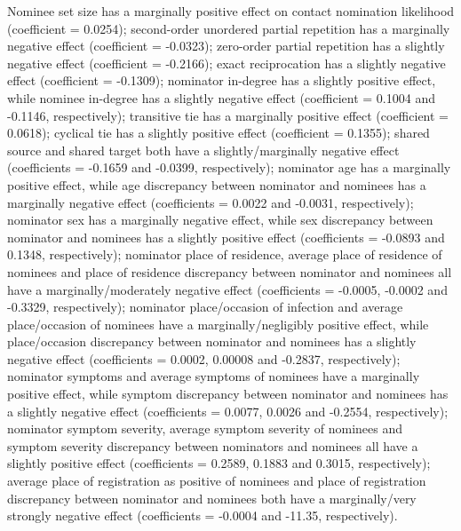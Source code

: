 Nominee set size has a marginally positive effect on contact nomination likelihood (coefficient = 0.0254); second-order unordered partial repetition has a marginally negative effect (coefficient = -0.0323); zero-order partial repetition has a slightly negative effect (coefficient = -0.2166); exact reciprocation has a slightly negative effect (coefficient = -0.1309); nominator in-degree has a slightly positive effect, while nominee in-degree has a slightly negative effect (coefficient = 0.1004 and -0.1146, respectively); transitive tie has a marginally positive effect (coefficient = 0.0618); cyclical tie has a slightly positive effect (coefficient = 0.1355); shared source and shared target both have a slightly/marginally negative effect (coefficients = -0.1659 and -0.0399, respectively); nominator age has a marginally positive effect, while age discrepancy between nominator and nominees has a marginally negative effect (coefficients = 0.0022 and -0.0031, respectively); nominator sex has a marginally negative effect, while sex discrepancy between nominator and nominees has a slightly positive effect (coefficients = -0.0893 and 0.1348, respectively); nominator place of residence, average place of residence of nominees and place of residence discrepancy between nominator and nominees all have a marginally/moderately negative effect (coefficients = -0.0005, -0.0002 and -0.3329, respectively); nominator place/occasion of infection and average place/occasion of nominees have a marginally/negligibly positive effect, while place/occasion discrepancy between nominator and nominees has a slightly negative effect (coefficients = 0.0002, 0.00008 and -0.2837, respectively); nominator symptoms and average symptoms of nominees have a marginally positive effect, while symptom discrepancy between nominator and nominees has a slightly negative effect (coefficients = 0.0077, 0.0026 and -0.2554, respectively); nominator symptom severity, average symptom severity of nominees and symptom severity discrepancy between nominators and nominees all have a slightly positive effect (coefficients = 0.2589, 0.1883 and 0.3015, respectively); average place of registration as positive of nominees and place of registration discrepancy between nominator and nominees both have a marginally/very strongly negative effect (coefficients = -0.0004 and -11.35, respectively).

